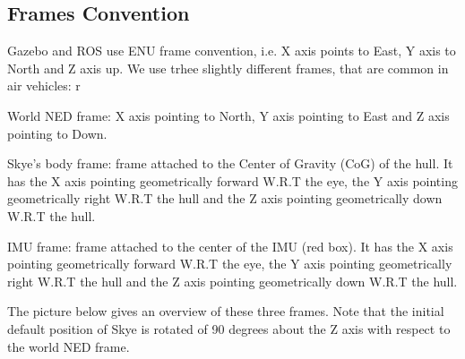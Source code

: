 {\ttfamily \subsection*{Frames Convention}}

{\ttfamily  Gazebo and R\-O\-S use E\-N\-U frame convention, i.\-e. X axis points to East, Y axis to North and Z axis up. We use trhee slightly different frames, that are common in air vehicles\-: r}

{\ttfamily 
\begin{DoxyItemize}
\item World N\-E\-D frame\-: X axis pointing to North, Y axis pointing to East and Z axis pointing to Down.
\item Skye's body frame\-: frame attached to the Center of Gravity (Co\-G) of the hull. It has the X axis pointing geometrically forward W.\-R.\-T the eye, the Y axis pointing geometrically right W.\-R.\-T the hull and the Z axis pointing geometrically down W.\-R.\-T the hull.
\item I\-M\-U frame\-: frame attached to the center of the I\-M\-U (red box). It has the X axis pointing geometrically forward W.\-R.\-T the eye, the Y axis pointing geometrically right W.\-R.\-T the hull and the Z axis pointing geometrically down W.\-R.\-T the hull.
\end{DoxyItemize}}

{\ttfamily The picture below gives an overview of these three frames. Note that the initial default position of Skye is rotated of 90 degrees about the Z axis with respect to the world N\-E\-D frame.}

{\ttfamily }

{\ttfamily   }

{\ttfamily  }